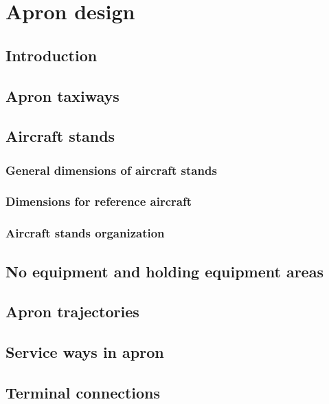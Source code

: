 \chapter{Apron design}

	\section{Introduction}
	
	\section{Apron taxiways}
	
	\section{Aircraft stands}
		\subsection{General dimensions of aircraft stands}
		\subsection{Dimensions for reference aircraft}
		\subsection{Aircraft stands organization}
		
	\section{No equipment and holding equipment areas}
	
	\section{Apron trajectories}
	
	\section{Service ways in apron}
	
	\section{Terminal connections}
	